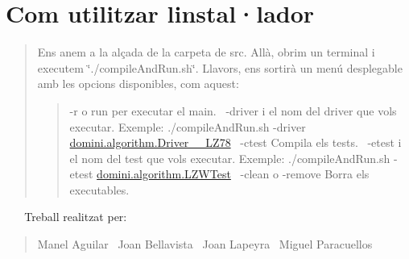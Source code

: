 \section*{Com utilitzar l\textquotesingle{}instal·lador}

\begin{quote}
Ens anem a la alçada de la carpeta de src. Allà, obrim un terminal i executem \char`\"{}./compile\+And\+Run.\+sh\char`\"{}. Llavors, ens sortirà un menú desplegable amb les opcions disponibles, com aquest\+: \begin{quote}
-\/r o run per executar el main.~\newline
 -\/driver i el nom del driver que vols executar. Exemple\+: ./compile\+And\+Run.sh -\/driver \hyperlink{classdomini_1_1algorithm_1_1Driver____LZ78}{domini.\+algorithm.\+Driver\+\_\+\+\_\+\+L\+Z78}~\newline
 -\/ctest Compila els tests.~\newline
 -\/etest i el nom del test que vols executar. Exemple\+: ./compile\+And\+Run.sh -\/etest \hyperlink{classdomini_1_1algorithm_1_1LZWTest}{domini.\+algorithm.\+L\+Z\+W\+Test}~\newline
 -\/clean o -\/remove Borra els executables. \end{quote}
\end{quote}
~\newline
 ~\newline
 Treball realitzat per\+: \begin{quote}
Manel Aguilar~\newline
 Joan Bellavista~\newline
 Joan Lapeyra~\newline
 Miguel Paracuellos~\newline
\end{quote}

